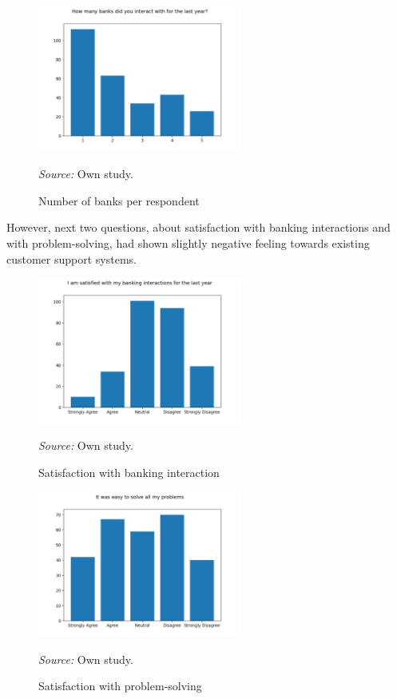 \begin{figure}
    \centering
    \includegraphics[width=0.6\textwidth,height=\textheight,keepaspectratio]{survey/2_how_many_banks_did_you_interact_with_for_the_last_year?.png}
    \caption{Number of banks per respondent}
    \medskip
    \footnotesize\textit{Source:} Own study.
\end{figure}

However, next two questions, about satisfaction with banking interactions and with problem-solving, had shown slightly negative feeling towards existing customer support systems.

\begin{figure}
    \centering
    \includegraphics[width=0.6\textwidth,height=\textheight,keepaspectratio]{survey/3_i_am_satisfied_with_my_banking_interactions_for_the_last_year.png}
    \caption{Satisfaction with banking interaction}
    \medskip
    \footnotesize\textit{Source:} Own study.
\end{figure}

\begin{figure}
    \centering
    \includegraphics[width=0.6\textwidth,height=\textheight,keepaspectratio]{survey/4_it_was_easy_to_solve_all_my_problems.png}
    \caption{Satisfaction with problem-solving}
    \medskip
    \footnotesize\textit{Source:} Own study.
\end{figure}

